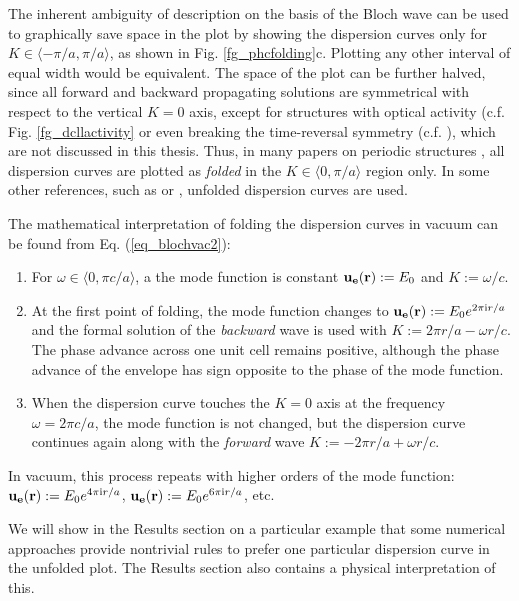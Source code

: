 The inherent ambiguity of description on the basis of the Bloch wave can be used to graphically save space in the plot by showing the dispersion curves only for $K\in\langle-\pi/a, \pi/a\rangle$, as shown in Fig. \ref{fg_phcfolding}c. Plotting any other interval of equal width would be equivalent. 
The space of the plot can be further halved, since all forward and backward propagating solutions are symmetrical with respect to the vertical $K=0$ axis, except for structures with optical activity (c.f. Fig. \ref{fg_dcllactivity} or even breaking the time-reversal symmetry (c.f. \cite{vanwolleghem2009unidirectional}), which are not discussed in this thesis. Thus, in many papers on periodic structures \cite{obrien2002photonic,yannopapas2005negative}, all dispersion curves are plotted as \textit{folded} in the $K\in\langle0, \pi/a\rangle$ region only. In some other references, such as \cite{mortensen2010unambiguous} or \cite{yeh1977electromagnetic}, unfolded dispersion curves are used.

The mathematical interpretation of folding the dispersion curves in vacuum can be found from Eq. (\ref{eq_blochvac2}): 
\begin{enumerate}
\item{
For  $\omega\in\langle 0, \pi c /a\rangle$, a the mode function is constant $\mathbf{u_e}({\mathbf{r}}) := E_0$ and $K := \omega/c$. 
} 
\item{
At the first point of folding, the mode function changes to $\mathbf{u_e}({\mathbf{r}}) := E_0 e^{2\pi{\mathrm i} r/a}$ and the formal solution of the \textit{backward} wave is used with $K := 2\pi r/a - \omega r/c$.  The phase advance across one unit cell remains positive, although the phase advance of the envelope has sign opposite to the phase of the mode function.
} 
\item{
When the dispersion curve touches the $K=0$ axis at the frequency $\omega = 2\pi c/a$, the mode function is not changed, but the dispersion curve continues again along with the \textit{forward} wave $K := - 2\pi r/a + \omega r/c$.
} 
 \end{enumerate}
In vacuum, this process repeats with higher orders of the mode function: $\mathbf{u_e}({\mathbf{r}}) := E_0 e^{4\pi{\mathrm i} r/a}$, $\mathbf{u_e}({\mathbf{r}}) := E_0 e^{6\pi{\mathrm i} r/a}$, etc.

We will show in the Results section on a particular example that some numerical approaches provide nontrivial rules to prefer one particular dispersion curve in the unfolded plot. The Results section also contains a physical interpretation of this.

